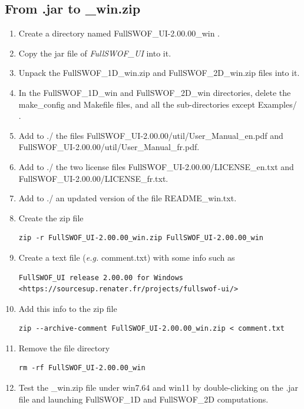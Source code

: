 \documentclass[a4paper, 11pt]{article}
\newcommand{\FullSWOFUI}{\emph{FullSWOF\_UI}}
\begin{document}
\subsection{From .jar  to \_win.zip}
\begin{enumerate}

\item Create a directory named FullSWOF\_UI-2.00.00\_win .

\item Copy the jar file of \FullSWOFUI{} into it.

\item Unpack the FullSWOF\_1D\_win.zip and FullSWOF\_2D\_win.zip files into it.

\item In the FullSWOF\_1D\_win and FullSWOF\_2D\_win directories, delete the make\_config and Makefile files, and all the sub-directories except Examples/ .

\item Add to ./ the files 
FullSWOF\_UI-2.00.00/util/User\_Manual\_en.pdf and
FullSWOF\_UI-2.00.00/util/User\_Manual\_fr.pdf.

\item Add to ./ the two license files FullSWOF\_UI-2.00.00/LICENSE\_en.txt and
FullSWOF\_UI-2.00.00/LICENSE\_fr.txt.

\item Add to ./ an updated version of the file README\_win.txt.

\item Create the zip file
\begin{verbatim}
zip -r FullSWOF_UI-2.00.00_win.zip FullSWOF_UI-2.00.00_win
\end{verbatim}
\item Create a text file (\emph{e.g.} comment.txt) with some info such as
\begin{verbatim}
FullSWOF_UI release 2.00.00 for Windows
<https://sourcesup.renater.fr/projects/fullswof-ui/>
\end{verbatim}
\item Add this info to the zip file
\begin{verbatim}
zip --archive-comment FullSWOF_UI-2.00.00_win.zip < comment.txt
\end{verbatim}
\item Remove the file directory
\begin{verbatim}
rm -rf FullSWOF_UI-2.00.00_win
\end{verbatim}
\item Test the \_win.zip file under win7.64 and win11 by
double-clicking on the .jar file and launching FullSWOF\_1D and FullSWOF\_2D computations.
\end{enumerate}
\end{document}
